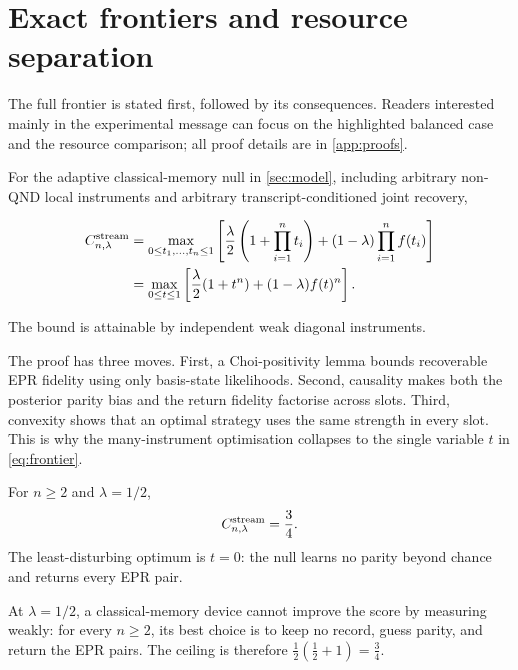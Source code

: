 \section{Exact frontiers and resource separation}
\label{sec:results}

The full frontier is stated first, followed by its consequences. Readers interested mainly in the experimental message can focus on the highlighted balanced case and the resource comparison; all proof details are in \cref{app:proofs}.

\begin{theorem}
For the adaptive classical-memory null in \cref{sec:model}, including arbitrary non-QND local instruments and arbitrary transcript-conditioned joint recovery,
\begin{small}
\begin{align}
C^{\mathrm{stream}}_{n,\lambda}
&=\max_{0\leq t_1,\ldots,t_n\leq1}
\left[
\frac{\lambda}{2}\left(1+\prod_{i=1}^n t_i\right)
+(1-\lambda)\prod_{i=1}^n f(t_i)
\right] \label{eq:productfrontier}\\
&=\max_{0\leq t\leq1}
\left[
\frac{\lambda}{2}(1+t^n)+(1-\lambda)f(t)^n
\right].
\label{eq:frontier}
\end{align}
\end{small}
The bound is attainable by independent weak diagonal instruments.
\end{theorem}

The proof has three moves. First, a Choi-positivity lemma bounds recoverable EPR fidelity using only basis-state likelihoods. Second, causality makes both the posterior parity bias and the return fidelity factorise across slots. Third, convexity shows that an optimal strategy uses the same strength in every slot. This is why the many-instrument optimisation collapses to the single variable $t$ in \eqref{eq:frontier}.

\begin{corollary}
For $n\geq2$ and $\lambda=1/2$,
\[
C^{\mathrm{stream}}_{n,\lambda}=\frac34.
\]
The least-disturbing optimum is $t=0$: the null learns no parity beyond chance and returns every EPR pair.
\end{corollary}

\begin{takeaway}
At $\lambda=1/2$, a classical-memory device cannot improve the score by measuring weakly: for every $n\geq2$, its best choice is to keep no record, guess parity, and return the EPR pairs. The ceiling is therefore $\tfrac12(\tfrac12+1)=\tfrac34$.
\end{takeaway}

